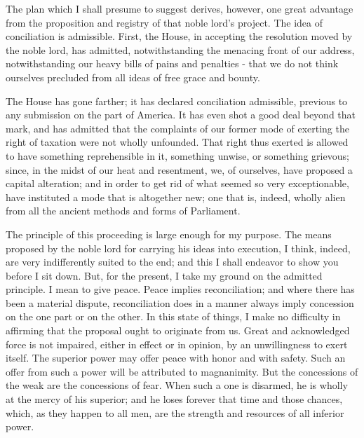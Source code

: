 The plan which I shall presume to suggest derives, however, one great advantage from the proposition and registry of that noble lord’s project. The idea of conciliation is admissible. First, the House, in accepting the resolution moved by the noble lord, has admitted, notwithstanding the menacing front of our address, notwithstanding our heavy bills of pains and penalties - that we do not think ourselves precluded from all ideas of free grace and bounty.\par

The House has gone farther; it has declared conciliation admissible, previous to any submission on the part of America. It has even shot a good deal beyond that mark, and has admitted that the complaints of our former mode of exerting the right of taxation were not wholly unfounded. That right thus exerted is allowed to have something reprehensible in it, something unwise, or something grievous; since, in the midst of our heat and resentment, we, of ourselves, have proposed a capital alteration; and in order to get rid of what seemed so very exceptionable, have instituted a mode that is altogether new; one that is, indeed, wholly alien from all the ancient methods and forms of Parliament.\par

The principle of this proceeding is large enough for my purpose. The means proposed by the noble lord for carrying his ideas into execution, I think, indeed, are very indifferently suited to the end; and this I shall endeavor to show you before I sit down. But, for the present, I take my ground on the admitted principle. I mean to give peace. Peace implies reconciliation; and where there has been a material dispute, reconciliation does in a manner always imply concession on the one part or on the other. In this state of things, I make no difficulty in affirming that the proposal ought to originate from us. Great and acknowledged force is not impaired, either in effect or in opinion, by an unwillingness to exert itself. The superior power may offer peace with honor and with safety. Such an offer from such a power will be attributed to magnanimity. But the concessions of the weak are the concessions of fear. When such a one is disarmed, he is wholly at the mercy of his superior; and he loses forever that time and those chances, which, as they happen to all men, are the strength and resources of all inferior power.\par

